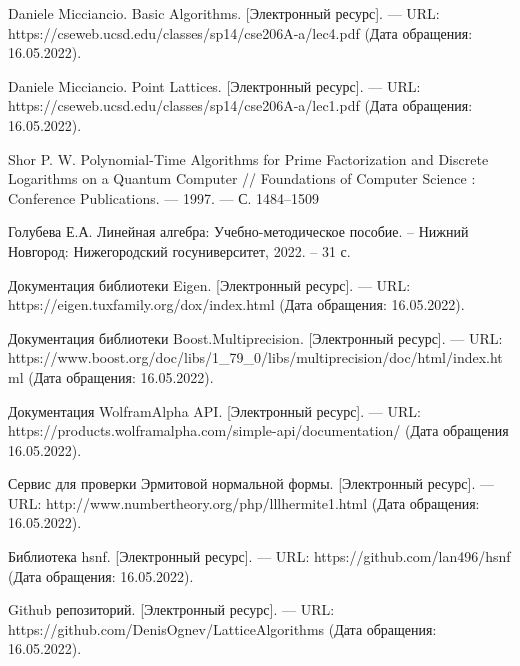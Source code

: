 \newpage


\begin{thebibliography}{10}

Daniele Micciancio. Basic Algorithms. [Электронный ресурс]. --- URL: https://cseweb.ucsd.edu/classes/sp14/cse206A-a/lec4.pdf (Дата обращения: 16.05.2022).

Daniele Micciancio. Point Lattices. [Электронный ресурс]. --- URL: https://cseweb.ucsd.edu/classes/sp14/cse206A-a/lec1.pdf (Дата обращения: 16.05.2022).

Shor P. W. Polynomial-Time Algorithms for Prime Factorization and Discrete Logarithms on a Quantum Computer // Foundations of Computer Science : Conference Publications. — 1997. — С. 1484–1509

Голубева Е.А. Линейная алгебра: Учебно-методическое
пособие. – Нижний Новгород: Нижегородский госуниверситет, 2022. – 31 с.

Документация библиотеки Eigen. [Электронный ресурс]. --- URL: https://eigen.tuxfamily.org/dox/index.html (Дата обращения: 16.05.2022).

Документация библиотеки Boost.Multiprecision. [Электронный ресурс]. --- URL: https://www.boost.org/doc/libs/1\_79\_0/libs/multiprecision/doc/html/index.html (Дата обращения: 16.05.2022).

Документация WolframAlpha API. [Электронный ресурс]. --- URL: https://products.wolframalpha.com/simple-api/documentation/ (Дата обращения 16.05.2022).

Сервис для проверки Эрмитовой нормальной формы. [Электронный ресурс]. --- URL: http://www.numbertheory.org/php/lllhermite1.html (Дата обращения: 16.05.2022).

Библиотека hsnf. [Электронный ресурс]. --- URL: https://github.com/lan496/hsnf (Дата обращения: 16.05.2022).

Github репозиторий. [Электронный ресурс]. --- URL: https://github.com/DenisOgnev/LatticeAlgorithms (Дата обращения: 16.05.2022).
 

\end{thebibliography}

\clearpage